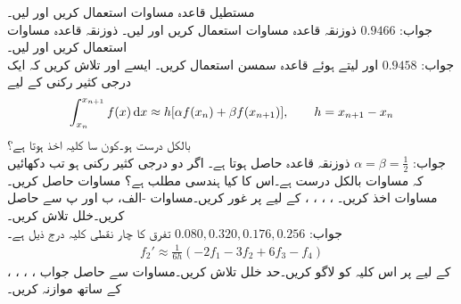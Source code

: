 \quad
مستطیل قاعدہ مساوات  استعمال کریں اور  لیں۔\\
جواب:\quad
$\num{0.9466}$
\quad
ذوزنقہ قاعدہ مساوات  استعمال کریں اور  لیں۔
\quad
ذوزنقہ قاعدہ مساوات  استعمال کریں اور  لیں۔\\
جواب:\quad
$\num{0.9458}$
\quad
{} اور  لیتے ہوئے قاعدہ سمسن  استعمال کریں۔
\quad
ایسے  اور  تلاش کریں کہ ایک درجی کثیر رکنی کے لیے
\begin{align*}
\int_{x_n}^{x_{n+1}}f(x)\dif x\approx h[\alpha f(x_n)+\beta f(x_{n+1})],\quad \quad h=x_{n+1}-x_n
\end{align*}
بالکل درست ہو۔کون سا کلیہ اخذ ہوتا ہے؟\\
جواب:\quad
$\alpha=\beta=\tfrac{1}{2}$
ذوزنقہ قاعدہ حاصل ہوتا ہے۔
\quad
اگر  دو درجی کثیر رکنی ہو تب دکھائیں کہ مساوات  بالکل درست ہے۔اس کا کیا ہندسی مطلب ہے؟  
\quad
مساوات  حاصل کریں۔
\quad
مساوات  اخذ کریں۔
\quad
{}، ، ، ،  کے لیے  پر غور کریں۔مساوات -الف، ب اور پ سے  حاصل کریں۔خلل تلاش کریں۔\\
جواب:\quad
$0.080,0.320,0.176,0.256$
\quad
تفرق کا چار نقطی کلیہ درج ذیل ہے۔
\begin{align*}
f_2'\approx \frac{1}{6h}(-2f_1-3f_2+6f_3-f_4)
\end{align*}
، ، ، ،  کے لیے  پر اس کلیہ کو لاگو کریں۔حد خلل تلاش کریں۔مساوات  سے حاصل جواب کے ساتھ موازنہ کریں۔
\quad

